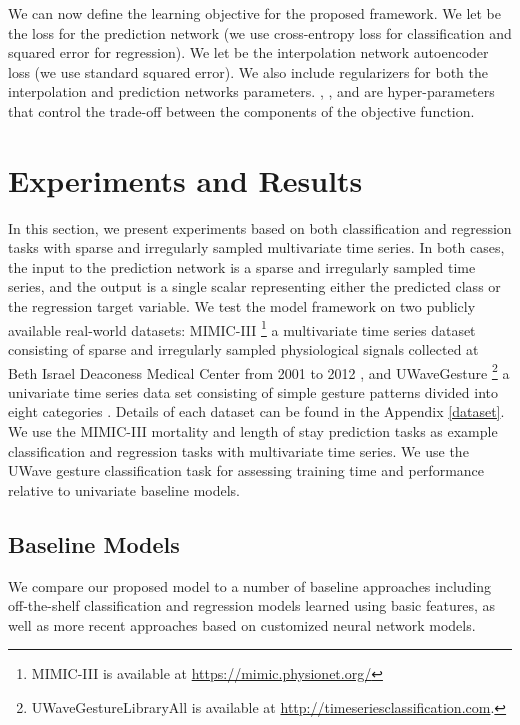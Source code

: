 \documentclass{article} \usepackage{iclr2019_conference,times}
\begin{document}
We can now define the learning objective for
the proposed framework. We let  be the loss for the prediction
network (we use cross-entropy loss for classification and squared 
error for regression). We let  be the interpolation network autoencoder loss (we use standard squared error).
We also include  regularizers for both the interpolation
and prediction networks parameters. , , and  are
hyper-parameters that control the trade-off between the components of the
objective function.








 

\section{Experiments and Results}

In  this section, we present experiments based on  both classification and regression tasks with sparse and irregularly sampled multivariate time series.
In both cases, the input to the prediction network is a sparse and irregularly sampled time series,
and the output is a single scalar representing either the predicted class or the regression target variable.
We test the model framework on two publicly available real-world datasets: MIMIC-III \footnote{MIMIC-III  is  available at \url{https://mimic.physionet.org/}}  a multivariate time series dataset consisting of sparse and irregularly sampled physiological signals collected at Beth Israel Deaconess Medical Center
from 2001 to 2012 \citep{johnson2016mimic}, and UWaveGesture \footnote{UWaveGestureLibraryAll is available at \url{http://timeseriesclassification.com}.}  a univariate time series data set consisting of simple gesture patterns divided into eight categories \citep{uwave}. Details of each dataset can be found in the Appendix \ref{dataset}.  We use the MIMIC-III mortality and length of stay prediction tasks as example classification and regression tasks with multivariate time series. We use the UWave gesture  classification task for assessing training time and performance relative to univariate baseline models.








\subsection{Baseline Models}
We compare our proposed model to a number of baseline approaches including off-the-shelf classification
and regression models learned using basic features, as well as more recent approaches
based on customized neural network models. 
\end{document}
